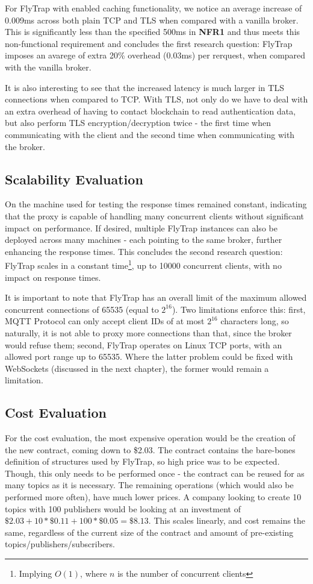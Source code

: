 For FlyTrap with enabled caching functionality, we notice an average increase of 0.009ms across both plain TCP and TLS when compared with a vanilla broker. This is significantly less than the specified 500ms in \textbf{NFR1} and thus meets this non-functional requirement and concludes the first research question: FlyTrap imposes an avarege of extra 20\% overhead (0.03ms) per rerquest, when compared with the vanilla broker.

It is also interesting to see that the increased latency is much larger in TLS connections when compared to TCP. With TLS, not only do we have to deal with an extra overhead of having to contact blockchain to read authentication data, but also perform TLS encryption/decryption twice - the first time when communicating with the client and the second time when communicating with the broker.
\subsection{Scalability Evaluation}
On the machine used for testing the response times remained constant, indicating that the proxy is capable of handling many concurrent clients without significant impact on performance. If desired, multiple FlyTrap instances can also be deployed across many machines - each pointing to the same broker, further enhancing the response times. This concludes the second research question: FlyTrap scales in a constant time\footnote{Implying $O(1)$, where $n$ is the number of concurrent clients}, up to 10000 concurrent clients, with no impact on response times.

It is important to note that FlyTrap has an overall limit of the maximum allowed concurrent connections of 65535 (equal to $2^{16}$). Two limitations enforce this: first, MQTT Protocol can only accept client IDs of at most $2^{16}$ characters long, so naturally, it is not able to proxy more connections than that, since the broker would refuse them; second, FlyTrap operates on Linux TCP ports, with an allowed port range up to 65535. Where the latter problem could be fixed with WebSockets (discussed in the next chapter), the former would remain a limitation.
\subsection{Cost Evaluation}
For the cost evaluation, the most expensive operation would be the creation of the new contract, coming down to \$2.03. The contract contains the bare-bones definition of structures used by FlyTrap, so high price was to be expected. Though, this only needs to be performed once - the contract can be reused for as many topics as it is necessary. The remaining operations (which would also be performed more often), have much lower prices. A company looking to create 10 topics with 100 publishers would be looking at an investment of $\$2.03 + 10 * \$0.11 + 100 * \$0.05 = \$8.13$. This scales linearly, and cost remains the same, regardless of the current size of the contract and amount of pre-existing topics/publishers/subscribers.

